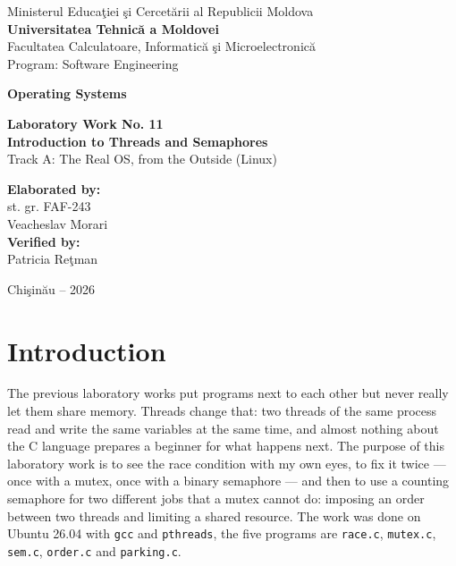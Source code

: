 \documentclass[12pt,a4paper]{article}
\begin{document}
\begin{titlepage}
    \centering
    Ministerul Educa\c{t}iei \c{s}i Cercet\u{a}rii al Republicii Moldova\\[0.4cm]
    \textbf{Universitatea Tehnic\u{a} a Moldovei}\\[0.4cm]
    Facultatea Calculatoare, Informatic\u{a} \c{s}i Microelectronic\u{a}\\[0.2cm]
    Program: Software Engineering

    \vspace{3cm}

    {\LARGE \textbf{Operating Systems}}

    \vspace{1.2cm}

    {\Large \textbf{Laboratory Work No. 11}}\\[0.6cm]
    {\LARGE \textbf{Introduction to Threads and Semaphores}}\\[0.3cm]
    Track A: The Real OS, from the Outside (Linux)

    \vspace{3cm}

    \begin{flushright}
        \textbf{Elaborated by:}\\
        st. gr. FAF-243\\
        Veacheslav Morari\\[0.6cm]
        \textbf{Verified by:}\\
        Patricia Re\c{t}man
    \end{flushright}

    \vfill
    Chi\c{s}in\u{a}u -- 2026
\end{titlepage}

\tableofcontents
\newpage

\section*{Introduction}

The previous laboratory works put programs next to each other but never really let them share memory. Threads change that: two threads of the same process read and write the same variables at the same time, and almost nothing about the C language prepares a beginner for what happens next. The purpose of this laboratory work is to see the race condition with my own eyes, to fix it twice --- once with a mutex, once with a binary semaphore --- and then to use a counting semaphore for two different jobs that a mutex cannot do: imposing an order between two threads and limiting a shared resource. The work was done on Ubuntu 26.04 with \texttt{gcc} and \texttt{pthreads}, the five programs are \texttt{race.c}, \texttt{mutex.c}, \texttt{sem.c}, \texttt{order.c} and \texttt{parking.c}.
\end{document}
